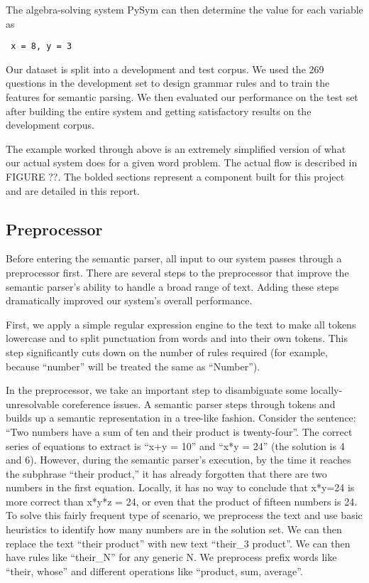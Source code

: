 \documentclass[11pt]{article}
\begin{document}
The algebra-solving system PySym can then determine the value for each variable as

\begin{center}
    \texttt{
x = 8, y = 3
    }
\end{center}

Our dataset is split into a development and test corpus. We used the 269 questions in the development set to design grammar rules and to train the features for semantic parsing. We then evaluated our performance on the test set after building the entire system and getting satisfactory results on the development corpus.

The example worked through above is an extremely simplified version of what our actual system does for a given word problem. The actual flow is described in FIGURE ??. The bolded sections represent a component built for this project and are detailed in this report.

\subsection{Preprocessor}

Before entering the semantic parser, all input to our system passes through a preprocessor first. There are several steps to the preprocessor that improve the semantic parser’s ability to handle a broad range of text. Adding these steps dramatically improved our system’s overall performance.

First, we apply a simple regular expression engine to the text to make all tokens lowercase and to split punctuation from words and into their own tokens. This step significantly cuts down on the number of rules required (for example, because ``number'' will be treated the same as ``Number'').

In the preprocessor, we take an important step to disambiguate some locally-unresolvable coreference issues. A semantic parser steps through tokens and builds up a semantic representation in a tree-like fashion. Consider the sentence: ``Two numbers have a sum of ten and their product is twenty-four''. The correct series of equations to extract is ``x+y = 10'' and ``x*y = 24'' (the solution is 4 and 6). However, during the semantic parser’s execution, by the time it reaches the subphrase ``their product,'' it has already forgotten that there are two numbers in the first equation. Locally, it has no way to conclude that x*y=24 is more correct than x*y*z = 24, or even that the product of fifteen numbers is 24. To solve this fairly frequent type of scenario, we preprocess the text and use basic heuristics to identify how many numbers are in the solution set. We can then replace the text ``their product'' with new text ``their\_3 product''. We can then have rules like ``their\_N'' for any generic N. We preprocess prefix words like ``their, whose'' and different operations like ``product, sum, average''.
\end{document}
